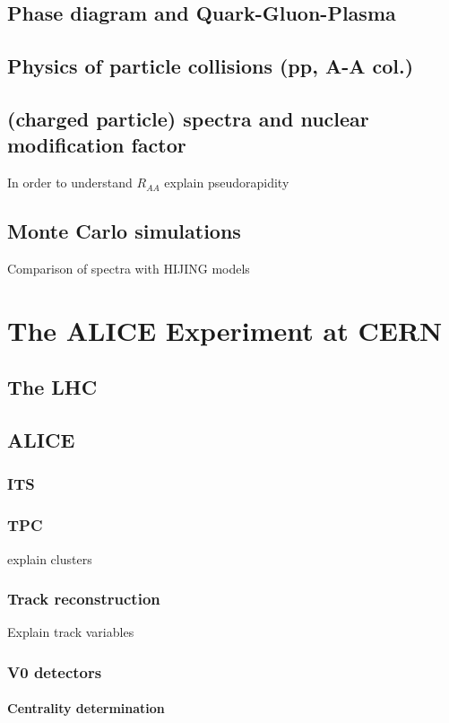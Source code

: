 \documentclass[12pt,a4paper]{report}
\begin{document}
\section{Phase diagram and Quark-Gluon-Plasma}
\section{Physics of particle collisions (pp, A-A col.)}
\section{(charged particle) \pt spectra and nuclear modification factor}
In order to understand $R_{AA}$ 
explain pseudorapidity
\section{Monte Carlo simulations}
Comparison of spectra with HIJING models

\chapter{The ALICE Experiment at CERN}

\section{The LHC}
\section{ALICE}
\subsection{ITS}
\subsection{TPC}
explain clusters
\subsection{Track reconstruction}
Explain track variables  %
\subsection{V0 detectors}
\subsubsection{Centrality determination}
\end{document}
